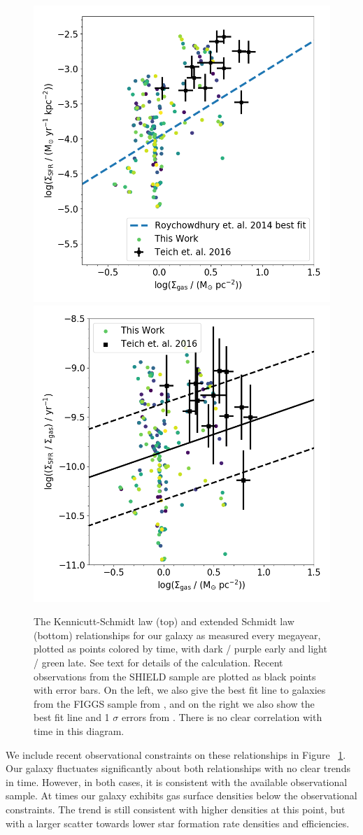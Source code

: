 \begin{figure}
\centering
\includegraphics[width=0.5\linewidth]{figures/ch1/all_gas_schmidt_law_evolution.png}\\
\includegraphics[width=0.5\linewidth]{figures/ch1/all_gas_efficiency_evolution.png}
\caption{The Kennicutt-Schmidt law (top) and extended Schmidt law (bottom) relationships for our galaxy as measured every megayear, plotted as points colored by time, with dark / purple early and light / green late. See text for details of the calculation. Recent observations from the SHIELD sample \protect\citep{Teich2016} are plotted as black points with error bars. On the left, we also give the best fit line to galaxies from the FIGGS sample from \protect\cite{Roychowdhury2014}, and on the right we also show the best fit line and 1 $\sigma$ errors from \protect\cite{Shi2011}. There is no clear correlation with time in this diagram.}
\label{ch1:fig:KS}
\end{figure}

We include recent observational constraints on these relationships in Figure ~\ref{ch1:fig:KS}. Our galaxy fluctuates significantly about both relationships with no clear trends in time. However, in both cases, it is consistent with the available observational sample. At times our galaxy exhibits gas surface densities below the observational constraints. The trend is still consistent with higher densities at this point, but with a larger scatter towards lower star formation rate densities and efficiencies.

